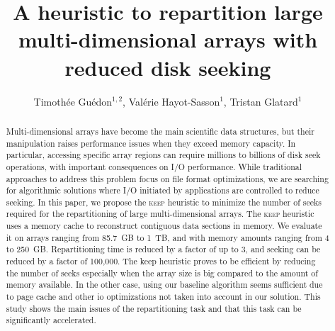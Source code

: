 \documentclass[sigconf, nonacm]{acmart}
\newcommand{\keep}[0]{\textsc{keep}\xspace}
\begin{document}
\title{A heuristic to repartition large multi-dimensional arrays with reduced disk seeking}

\author{Timoth\'ee Gu\'edon$^{1,2}$, Val\'erie Hayot-Sasson$^1$, Tristan Glatard$^1$}


\begin{abstract}
Multi-dimensional arrays have become the main scientific data structures,
but their manipulation raises performance issues when they exceed memory
capacity. In particular, accessing specific array regions can require
millions to billions of disk seek operations, with important consequences
on I/O performance. While traditional approaches to address this problem focus on
file format optimizations, we are searching for algorithmic solutions where
I/O initiated by applications are controlled to reduce seeking. In this
paper, we propose the \keep heuristic to minimize the number of seeks
required for the repartitioning of large multi-dimensional arrays. The
\keep heuristic uses a memory cache to reconstruct contiguous data
sections in memory. We evaluate it on arrays ranging from 85.7~GB to
1~TB, and with memory amounts ranging from 4 to 250~GB.
Repartitioning time is reduced by a factor of up to 3, and
seeking can be reduced by a factor of 100,000. The keep heuristic proves to be
efficient by reducing the number of seeks especially when the array size is
big compared to the amount of memory available. In the other case, using our baseline
algorithm seems sufficient due to page cache and other io optimizations not
taken into account in our solution. This study shows the main issues of the
repartitioning task and that this task can be significantly accelerated.

\end{abstract}

\maketitle
\end{document}
